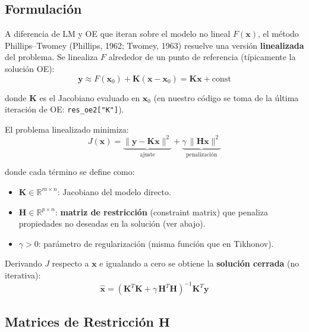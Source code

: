 \documentclass[a4paper,11pt]{article}
\begin{document}
\subsection{Formulaci\'on}

A diferencia de LM y OE que iteran sobre el modelo no lineal $F(\mathbf{x})$,
el m\'etodo Phillips--Twomey (Phillips, 1962; Twomey, 1963) resuelve una
versi\'on \textbf{linealizada} del problema.  Se linealiza $F$ alrededor de un
punto de referencia (t\'ipicamente la soluci\'on OE):
\begin{equation}
    \mathbf{y} \approx F(\mathbf{x}_0) + \mathbf{K}(\mathbf{x} - \mathbf{x}_0)
    = \mathbf{K}\mathbf{x} + \text{const}
\end{equation}

donde $\mathbf{K}$ es el Jacobiano evaluado en $\mathbf{x}_0$ (en nuestro
c\'odigo se toma de la \'ultima iteraci\'on de OE: \texttt{res\_oe2["K"]}).

El problema linealizado minimiza:
\begin{equation}
    J(\mathbf{x}) = \underbrace{\|\mathbf{y} - \mathbf{K}\mathbf{x}\|^2}_{\text{ajuste}}
    + \underbrace{\gamma\,\|\mathbf{H}\mathbf{x}\|^2}_{\text{penalizaci\'on}}
\end{equation}

donde cada t\'ermino se define como:
\begin{itemize}
    \item $\mathbf{K} \in \mathbb{R}^{m \times n}$: Jacobiano del modelo directo.
    \item $\mathbf{H} \in \mathbb{R}^{p \times n}$: \textbf{matriz de restricci\'on}
          (constraint matrix) que penaliza propiedades no deseadas en la
          soluci\'on (ver abajo).
    \item $\gamma > 0$: par\'ametro de regularizaci\'on (misma funci\'on que en
          Tikhonov).
\end{itemize}

Derivando $J$ respecto a $\mathbf{x}$ e igualando a cero se obtiene la
\textbf{soluci\'on cerrada} (no iterativa):
\begin{equation}\label{eq:pt_solution}
    \boxed{\hat{\mathbf{x}} = (\mathbf{K}^T\mathbf{K}
    + \gamma\,\mathbf{H}^T\mathbf{H})^{-1}\mathbf{K}^T\mathbf{y}}
\end{equation}

\subsection{Matrices de Restricci\'on $\mathbf{H}$}
\end{document}
